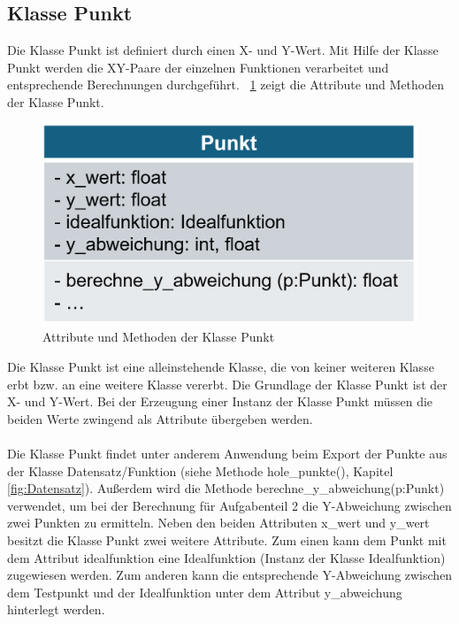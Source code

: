 \documentclass[11pt,a4paper]{scrreprt}
\newcommand{\abbildung}[1]{\figurename\ \ref{#1}}
\begin{document}
\subsection{Klasse Punkt}
\label{sub:Punkt}
Die Klasse Punkt ist definiert durch einen X- und Y-Wert. Mit Hilfe der Klasse Punkt werden die XY-Paare der einzelnen Funktionen verarbeitet und entsprechende Berechnungen durchgeführt. \abbildung{fig:Punkt} zeigt die Attribute und Methoden der Klasse Punkt. 
\begin{figure}[!h]
	\centering
	\includegraphics[scale=0.78]{Grafik_Klasse_Punkt}
	\caption{Attribute und Methoden der Klasse Punkt}
	\label{fig:Punkt}
\end{figure}
Die Klasse Punkt ist eine alleinstehende Klasse, die von keiner weiteren Klasse erbt bzw. an eine weitere Klasse vererbt. Die Grundlage der Klasse Punkt ist der X- und Y-Wert. Bei der Erzeugung einer Instanz der Klasse Punkt müssen die beiden Werte zwingend als Attribute übergeben werden. \\
\\
Die Klasse Punkt findet unter anderem Anwendung beim Export der Punkte aus der Klasse Datensatz/Funktion (siehe Methode hole\_punkte(), Kapitel \ref{fig:Datensatz}). Außerdem wird die Methode berechne\_y\_abweichung(p:Punkt) verwendet, um bei der Berechnung für Aufgabenteil 2 die Y-Abweichung zwischen zwei Punkten zu ermitteln. Neben den beiden Attributen x\_wert und y\_wert besitzt die Klasse Punkt zwei weitere Attribute. Zum einen kann dem Punkt mit dem Attribut idealfunktion eine Idealfunktion (Instanz der Klasse Idealfunktion) zugewiesen werden. Zum anderen kann die entsprechende Y-Abweichung zwischen dem Testpunkt und der Idealfunktion unter dem Attribut y\_abweichung hinterlegt werden. 
\end{document}
